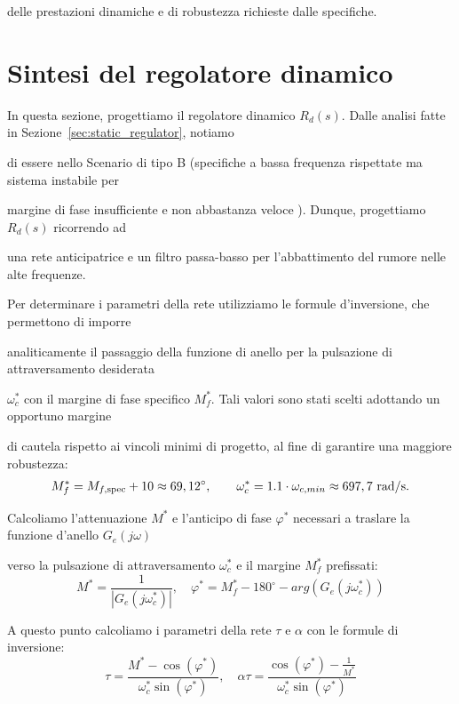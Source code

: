 \documentclass[a4paper, 11pt]{article}
\begin{document}
delle prestazioni dinamiche e di robustezza richieste dalle specifiche.

\section{Sintesi del regolatore dinamico}
\label{sec:dynamic_regulator}

In questa sezione, progettiamo il regolatore dinamico $R_d(s)$. 
%
Dalle analisi fatte in Sezione~\ref{sec:static_regulator}, notiamo

di essere nello Scenario di tipo B (specifiche a bassa frequenza rispettate ma sistema instabile per 

margine di fase insufficiente e non abbastanza 
veloce ). Dunque, progettiamo $R_d(s)$ ricorrendo ad 

una rete anticipatrice e un filtro passa-basso per l'abbattimento del rumore nelle alte frequenze. 

Per determinare i parametri della rete utilizziamo le formule d’inversione, che permettono di imporre 

analiticamente il passaggio della funzione di anello per la pulsazione di attraversamento desiderata 

$\omega_c^\ast$ con il margine di fase specifico $M_f^\ast$. 
Tali valori sono stati scelti adottando un opportuno margine 

di cautela rispetto ai vincoli minimi di progetto, al fine di garantire una maggiore robustezza:
\begin{subequations}
\begin{align}
 M_f^\ast = M_{f,\text{spec}} + 10 \approx69,12\degree,
\qquad \omega_c^\ast = 1.1 \cdot \omega_{c,min} \approx697,7 ~\text{rad/s}.
\end{align}
\end{subequations}

Calcoliamo l'attenuazione $M^\ast$ e l'anticipo di fase $\varphi^\ast$ necessari a traslare la funzione d'anello $G_e(j\omega)$ 

verso la pulsazione di attraversamento $\omega_c^\ast$ e il margine $M_f^\ast$ prefissati:
\begin{equation}
M^\ast = \frac{1}{|G_e(j\omega_c^\ast)|}, \quad \varphi^\ast = M_f^\ast - 180^\circ - arg( G_e(j\omega_c^\ast))
\end{equation}


A questo punto calcoliamo i parametri della rete $\tau$ e $\alpha$ con le formule di inversione:
\begin{equation}
\tau = \frac{M^\ast - \cos(\varphi^\ast)}{\omega_c^\ast \sin(\varphi^\ast)}, \quad \alpha\tau = \frac{\cos(\varphi^\ast) - \frac{1}{M^\ast}}{\omega_c^\ast \sin(\varphi^\ast)}
\end{equation}
\end{document}
